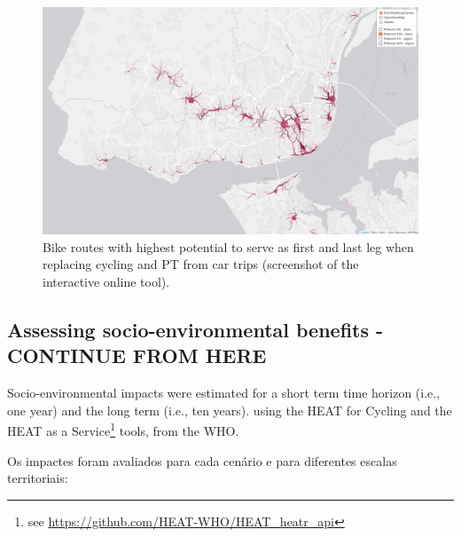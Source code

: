 \documentclass[runningheads]{llncs}
\begin{document}
\begin{figure}

{\centering \includegraphics[width=0.8\linewidth,]{img/map2} 

}

\caption{Bike routes with highest potential to serve as first and last leg when replacing cycling and PT from car trips (screenshot of the interactive online tool).}\label{fig:map2}
\end{figure}

\hypertarget{assessing-socio-environmental-benefits---continue-from-here}{%
\subsection{Assessing socio-environmental benefits - CONTINUE FROM
HERE}\label{assessing-socio-environmental-benefits---continue-from-here}}

Socio-environmental impacts were estimated for a short term time horizon
(i.e., one year) and the long term (i.e., ten years). using the HEAT for
Cycling and the HEAT as a Service\footnote{see
  \url{https://github.com/HEAT-WHO/HEAT_heatr_api}} tools, from the WHO.

Os impactes foram avaliados para cada cenário e para diferentes escalas
territoriais:
\end{document}
